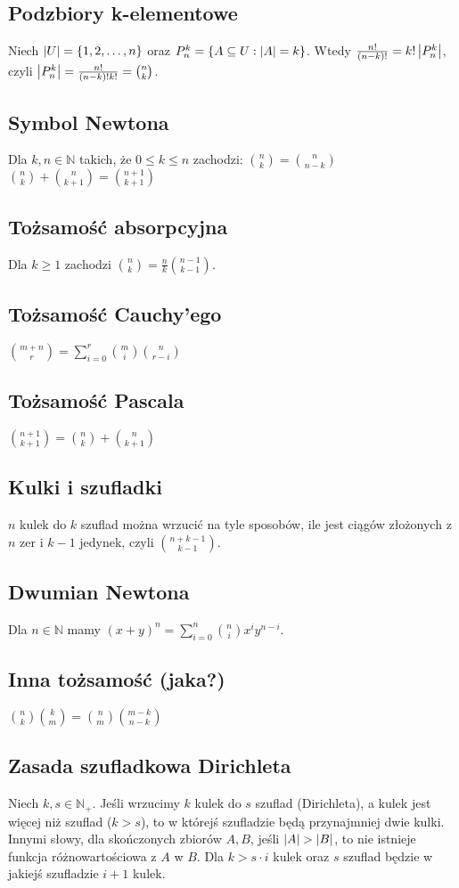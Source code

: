 \subsection*{Podzbiory k-elementowe}
Niech $\left| U \right| = \{ 1, 2, \ldots, n \}$ oraz $P_n^k = {\{ A \subseteq U : \left| A \right| = k \}}$.
Wtedy ${\frac{n!}{(n - k)!}} = {k! \left| P_n^k \right|}$, czyli 
$\left| P_n^k \right| = \frac{n!}{(n - k)! k!} = \binom{n}{k}$.

\subsection*{Symbol Newtona}
Dla $k, n \in \mathbb{N}$ takich, że $0 \leq k \leq n$ zachodzi:
$\binom{n}{k} = \binom{n}{n-k}$ \\
$\binom{n}{k} + \binom{n}{k+1} = \binom{n+1}{k+1}$

\subsection*{Tożsamość absorpcyjna}
Dla $k \geq 1$ zachodzi $\binom{n}{k} = \frac{n}{k} \binom{n-1}{k-1}$.

\subsection*{Tożsamość Cauchy'ego}
$\binom{m+n}{r} = \sum\limits_{i=0}^{r} \binom{m}{i} \binom{n}{r-i}$

\subsection*{Tożsamość Pascala}
$\binom{n+1}{k+1} = \binom{n}{k} + \binom{n}{k+1}$

\subsection*{Kulki i szufladki}
$n$ kulek do $k$ szuflad można wrzucić na tyle sposobów, ile jest ciągów złożonych
z $n$ zer i $k-1$ jedynek, czyli $\binom{n+k-1}{k-1}$.

\subsection*{Dwumian Newtona}
Dla $n \in \mathbb{N}$ mamy 
$(x+y)^n = \sum\limits_{i=0}^{n} \binom{n}{i} x^i y^{n-i}$.

\subsection*{Inna tożsamość (jaka?)}
$\binom{n}{k} \binom{k}{m} = \binom{n}{m} \binom{m-k}{n-k}$

\subsection*{Zasada szufladkowa Dirichleta}
Niech $k, s \in \mathbb{N}_+$. Jeśli wrzucimy $k$ kulek do $s$ szuflad (Dirichleta),
a kulek jest więcej niż szuflad ($k > s$), to w którejś szufladzie będą przynajmniej
dwie kulki. Innymi słowy, dla skończonych zbiorów $A, B$, jeśli $\left| A \right| > \left| B \right|$,
to nie istnieje funkcja różnowartościowa z $A$ w $B$. Dla $k > s\cdot i$ kulek oraz
$s$ szuflad będzie w jakiejś szufladzie $i + 1$ kulek.